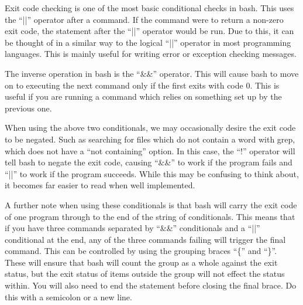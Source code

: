 \documentclass[a4paper,11pt]{report}
\begin{document}
			Exit code checking is one of the most basic conditional checks in bash. 
			This uses the ``||'' operator after a command. 
			If the command were to return a non-zero exit code, the statement after the ``||'' operator would be run. 
			Due to this, it can be thought of in a similar way to the logical ``||'' operator in most programming languages. 
			This is mainly useful for writing error or exception checking messages. 

			The inverse operation in bash is the ``\&\&'' operator. 
			This will cause bash to move on to executing the next command only if the first exits with code 0. 
			This is useful if you are running a command which relies on something set up by the previous one. 

			When using the above two conditionals, we may occasionally desire the exit code to be negated. 
			Such as searching for files which do not contain a word with grep, which does not have a ``not containing'' option. 
			In this case, the ``!'' operator will tell bash to negate the exit code, causing ``\&\&'' to work if the program fails and ``||'' to work if the program succeeds. 
			While this may be confusing to think about, it becomes far easier to read when well implemented. 

			A further note when using these conditionals is that bash will carry the exit code of one program through to the end of the string of conditionals. 
			This means that if you have three commands separated by ``\&\&'' conditionals and a ``||'' conditional at the end, any of the three commands failing will trigger the final command. 
			This can be controlled by using the grouping braces ``\{'' and ``\}''. 
			These will ensure that bash will count the group as a whole against the exit status, but the exit status of items outside the group will not effect the status within. 
			You will also need to end the statement before closing the final brace. 
			Do this with a semicolon or a new line. 
\end{document}
